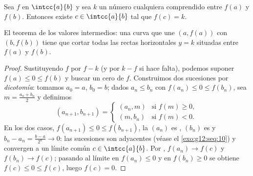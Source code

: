\begin{theorem}\label{thm:g12:limcont:ivt}
Sea $f$  en $\intcc{a}{b}$ y sea $k$ un número cualquiera
comprendido entre $f(a)$ y $f(b)$. Entonces existe $c \in \intcc{a}{b}$ tal
que $f(c) = k$.
\end{theorem}

\begin{omfigure}

{\small El teorema de los valores intermedios: una curva  que une
$(a, f(a))$ con $(b, f(b))$ tiene que cortar todas las rectas horizontales
$y = k$ situadas entre $f(a)$ y $f(b)$.}
\end{omfigure}

\begin{proof}
Sustituyendo $f$ por $f - k$ (y por $k - f$ si hace falta), podemos suponer
$f(a) \leq 0 \leq f(b)$ y buscar un cero de $f$. Construimos dos sucesiones
por \emph{dicotomía}: tomamos $a_0 = a$, $b_0 = b$; dados
$a_n \leq b_n$ con $f(a_n) \leq 0 \leq f(b_n)$, sea
$m = \frac{a_n + b_n}{2}$ y definimos
\[
(a_{n+1}, b_{n+1}) =
\begin{cases}
(a_n, m) & \text{si } f(m) \geq 0,\\
(m, b_n) & \text{si } f(m) < 0.
\end{cases}
\]
En los dos casos, $f(a_{n+1}) \leq 0 \leq f(b_{n+1})$, la  $(a_n)$
es , $(b_n)$ es  y
$b_n - a_n = \frac{b-a}{2^n} \to 0$: las sucesiones son adyacentes (véase
el \cref{exo:g12:seq:10}) y convergen a un límite común
$c \in \intcc{a}{b}$. Por , $f(a_n) \to f(c)$ y
$f(b_n) \to f(c)$; pasando al límite en $f(a_n) \leq 0$ y en
$f(b_n) \geq 0$ se obtiene $f(c) \leq 0 \leq f(c)$, luego $f(c) = 0$.
\end{proof}

